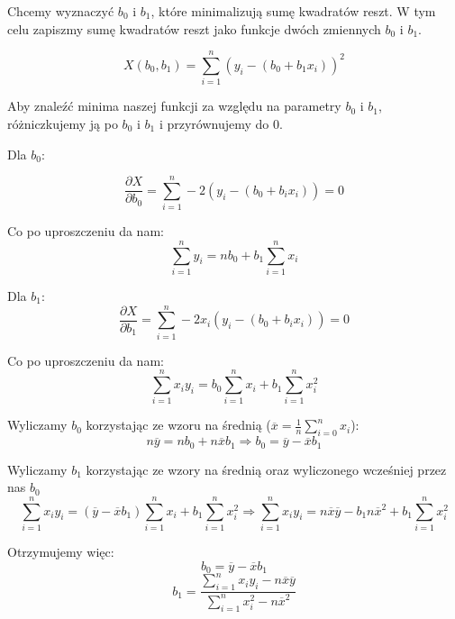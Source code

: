 \documentclass[11pt]{article}
\begin{document}
Chcemy wyznaczyć $b_0$ i $b_1$, które minimalizują sumę kwadratów reszt. W tym
celu zapiszmy sumę kwadratów reszt jako funkcje dwóch zmiennych $b_0$ i $b_1$.

\begin{equation}
  X(b_0,b_1) = \sum_{i=1}^{n} (y_i - (b_0 + b_1 x_i))^2
\end{equation}

Aby znaleźć minima naszej funkcji za względu na parametry $b_0$ i $b_1$,
różniczkujemy ją po $b_0$ i $b_1$ i przyrównujemy do 0.

Dla $b_0$:

\begin{equation}
  \frac{\partial X}{\partial b_0} = \sum_{i=1}^{n} -2(y_i - (b_0 + b_i x_i)) = 0
\end{equation}

Co po uproszczeniu da nam:
\begin{equation}
  \sum_{i=1}^{n} y_i = nb_0 + b_1 \sum_{i=1}^{n} x_i
\end{equation}

Dla $b_1$:
\begin{equation}
  \frac{\partial X}{\partial b_1} = \sum_{i=1}^{n} -2x_i(y_i - (b_0 + b_i x_i)) = 0
\end{equation}

Co po uproszczeniu da nam:
\begin{equation}
  \sum_{i=1}^{n} x_i y_i = b_0 \sum_{i=1}^{n} x_i + b_1 \sum_{i=1}^{n} x_i^2
\end{equation}

Wyliczamy $b_0$ korzystając ze wzoru na średnią ($\overline{x} = \frac{1}{n} \sum_{i=0}^{n}x_i$):
\begin{equation}
  n \overline{y} = n b_0 + n \overline{x} b_1 \Rightarrow b_0 = \overline{y} - \overline{x} b_1
\end{equation}

Wyliczamy $b_1$ korzystając ze wzory na średnią oraz wyliczonego wcześniej przez
nas $b_0$
\begin{equation}
  \sum_{i=1}^{n} x_i y_i = (\overline{y} - \overline{x} b_1) \sum_{i=1}^{n} x_i + b_1 \sum_{i=1}^{n} x_i^2 \Rightarrow \sum_{i=1}^{n} x_i y_i = n\overline{x}\overline{y} - b_1 n \overline{x}^2 + b_1 \sum_{i=1}^{n} x_i^2
\end{equation}

Otrzymujemy więc:
\begin{equation}
b_0 = \overline{y} - \overline{x} b_1
\end{equation}
\begin{equation}
  b_1 = \frac{\sum_{i=1}^{n} x_i y_i - n\overline{x}\overline{y}}{\sum_{i=1}^{n} x_i^2 - n \overline{x}^2}
\end{equation}
\end{document}
